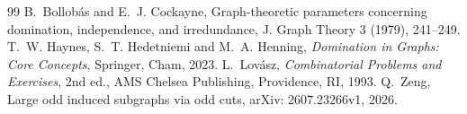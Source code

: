 \documentclass[10pt,a4paper]{amsart}
\newcommand{\1}{\mathbf{1}}
\begin{document}
\begin{thebibliography}{99}
 B.~Bollob\'as and E.~J. Cockayne, Graph-theoretic parameters concerning domination, independence, and irredundance, J. Graph Theory 3 (1979), 241--249.
 T.~W. Haynes, S.~T. Hedetniemi and M.~A. Henning, \emph{Domination in Graphs: Core Concepts}, Springer, Cham, 2023.
 L.~Lov\'asz, \emph{Combinatorial Problems and Exercises}, 2nd ed., AMS Chelsea Publishing, Providence, RI, 1993.
 Q.~Zeng, Large odd induced subgraphs via odd cuts, arXiv: 2607.23266v1, 2026.
\end{thebibliography}
\end{document}
